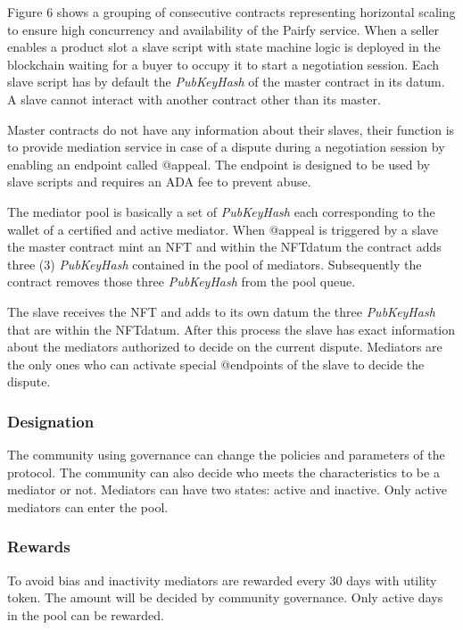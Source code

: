 \documentclass[12pt]{article}
\begin{document}
Figure 6 shows a grouping of consecutive contracts representing horizontal scaling to ensure high concurrency and availability of the Pairfy service.
When a seller enables a product slot a slave script with state machine logic is deployed in the blockchain waiting for a buyer to occupy it to start a negotiation session.
Each slave script has by default the \emph{PubKeyHash} of the master contract in its datum.
A slave cannot interact with another contract other than its master.

Master contracts do not have any information about their slaves, their function is to provide mediation service in case of a dispute during a negotiation session by enabling an endpoint called @appeal. The endpoint is designed to be used by slave scripts and requires an ADA fee to prevent abuse.


The mediator pool is basically a set of \emph{PubKeyHash} each corresponding to the wallet of a certified and active mediator. 
When @appeal is triggered by a slave the master contract mint an NFT and within the NFTdatum the contract adds three (3) \emph{PubKeyHash} contained in the pool of mediators.
Subsequently the contract removes those three \emph{PubKeyHash} from the pool queue.

The slave receives the NFT and adds to its own datum the three \emph{PubKeyHash} that are within the NFTdatum. After this process the slave has exact information about the mediators authorized to decide on the current dispute. Mediators are the only ones who can activate special @endpoints of the slave to decide the dispute.


\subsubsection { Designation } 

The community using governance can change the policies and parameters of the protocol. The community can also decide who meets the characteristics to be a mediator or not.
Mediators can have two states: active and inactive.
Only active mediators can enter the pool.

\subsubsection { Rewards } 

To avoid bias and inactivity mediators are rewarded every 30 days with utility token. The amount will be decided by community governance. Only active days in the pool can be rewarded.
\end{document}
